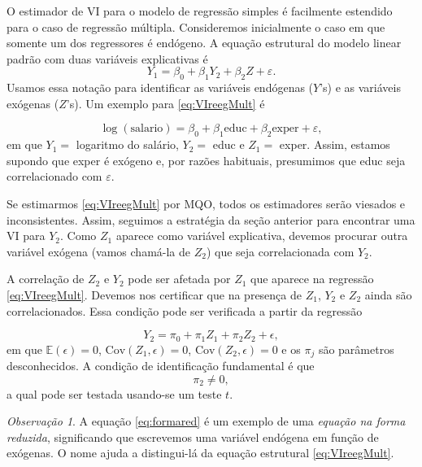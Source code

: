\documentclass[
]{book}
\theoremstyle{definition}
\theoremstyle{definition}
\theoremstyle{definition}
\theoremstyle{remark}
\newtheorem*{remark}{Observação}
\begin{document}
O estimador de VI para o modelo de regressão simples é facilmente estendido para o caso de regressão múltipla. Consideremos inicialmente o caso em que somente um dos regressores é endógeno. A equação estrutural do modelo linear padrão com duas variáveis explicativas é
\begin{equation}
 Y_1=\beta_0+\beta_1 Y_2+\beta_2Z+\varepsilon.
 \label{eq:VIreegMult}
\end{equation}
Usamos essa notação para identificar as variáveis endógenas (\(Y\)'s) e as variáveis exógenas
(\(Z\)'s).
Um exemplo para \eqref{eq:VIreegMult} é

\begin{equation}
 \log(\mathrm{salario})=\beta_0+\beta_1\mathrm{educ}+\beta_2\mathrm{exper}+\varepsilon,
 \label{eq:VIreegMult2}
\end{equation}
em que \(Y_1=\) logaritmo do salário, \(Y_2=\) educ e \(Z_1=\) exper. Assim, estamos supondo que
exper é exógeno e, por razões habituais, presumimos que educ seja correlacionado com \(\varepsilon\).

Se estimarmos \eqref{eq:VIreegMult} por MQO, todos os estimadores serão viesados e inconsistentes. Assim, seguimos a estratégia da seção anterior para encontrar uma VI para \(Y_2\). Como \(Z_1\) aparece como variável explicativa, devemos procurar outra variável exógena (vamos chamá-la de \(Z_2\)) que seja correlacionada com \(Y_2\).

A correlação de \(Z_2\) e \(Y_2\) pode ser afetada por \(Z_1\) que aparece na regressão \eqref{eq:VIreegMult}. Devemos nos certificar que na presença de \(Z_1\), \(Y_2\) e \(Z_2\) ainda são correlacionados.
Essa condição pode ser verificada a partir da regressão

\begin{equation}
 Y_2=\pi_0+\pi_1Z_1+\pi_2Z_2+\epsilon,
 \label{eq:fromared}
\end{equation}
em que \(\mathbb{E}(\epsilon)=0\), \(\mbox{Cov}(Z_1,\epsilon)=0\), \(\mbox{Cov}(Z_2,\epsilon)=0\) e os \(\pi_j\) são parâmetros desconhecidos. A condição de identificação fundamental é que
\[\pi_2\neq 0,\] a qual pode ser testada usando-se um teste \(t\).

\begin{remark}
{} A equação \eqref{eq:formared} é um exemplo de uma \emph{equação na forma reduzida},
significando que escrevemos uma variável endógena em função de exógenas. O nome ajuda a distingui-lá da equação estrutural \eqref{eq:VIreegMult}.
\end{remark}
\end{document}

